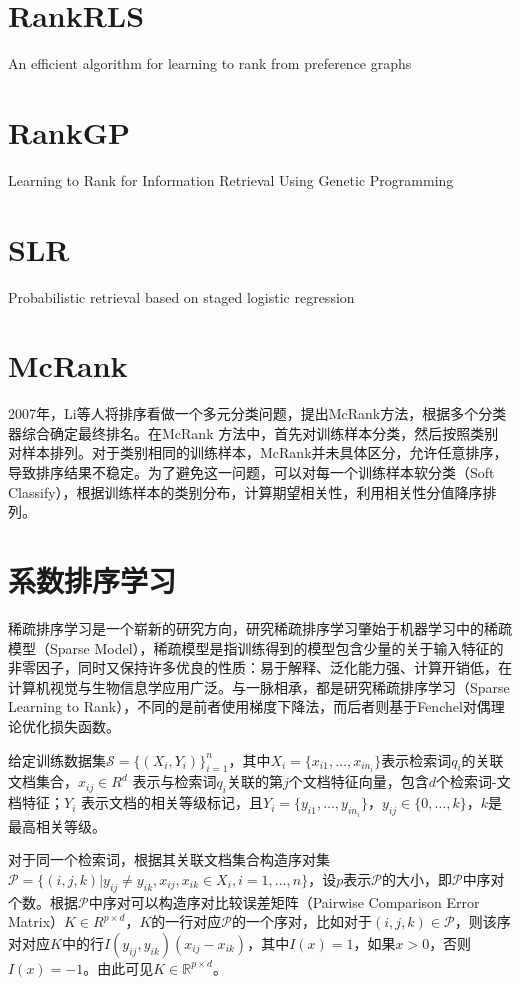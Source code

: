 \section{RankRLS}
An efficient algorithm for learning to rank from preference graphs\cite{pahikkala2009efficient}

\section{RankGP}
Learning to Rank for Information Retrieval Using Genetic Programming\cite{yeh2007learning}

\section{SLR}
Probabilistic retrieval based on staged logistic regression\cite{cooper1992probabilistic}

\section{McRank}
2007年，Li等人\cite{li2007mcrank}将排序看做一个多元分类问题，提出McRank方法，根据多个分类器综合确定最终排名。在McRank 方法中，首先对训练样本分类，然后按照类别对样本排列。对于类别相同的训练样本，McRank并未具体区分，允许任意排序，导致排序结果不稳定。为了避免这一问题，可以对每一个训练样本软分类（Soft Classify），根据训练样本的类别分布，计算期望相关性，利用相关性分值降序排列。

\section{系数排序学习}
稀疏排序学习是一个崭新的研究方向，研究稀疏排序学习肇始于机器学习中的稀疏模型（Sparse Model），稀疏模型是指训练得到的模型包含少量的关于输入特征的非零因子，同时又保持许多优良的性质：易于解释、泛化能力强、计算开销低，在计算机视觉与生物信息学应用广泛\cite{lai2012sparse}。\cite{lai2013efficient}与\cite{lai2012sparse}一脉相承，都是研究稀疏排序学习（Sparse Learning to Rank），不同的是前者使用梯度下降法，而后者则基于Fenchel对偶理论\cite{rifkin2007value}优化损失函数。

给定训练数据集$\mathcal{S} = \{(X_i,Y_i)\}_{i = 1}^n$，其中$X_i= \{x_{i1}, \ldots, x_{in_i}\}$表示检索词$q_i$的关联文档集合，$x_{ij}\in R^d$ 表示与检索词$q_i$关联的第$j$个文档特征向量，包含$d$个检索词-文档特征；$Y_i$ 表示文档的相关等级标记，且$Y_i = \{y_{i1},\ldots, y_{in_i}\}$，$y_{ij}\in \{0,\ldots, k\}$，$k$是最高相关等级。

对于同一个检索词，根据其关联文档集合构造序对集$\mathscr P = \{(i,j,k)| y_{ij}\ne y_{ik}, x_{ij}, x_{ik}\in X_i, i = 1,\ldots,n\}$，设$p$表示$\mathscr P$的大小，即$\mathscr P$中序对个数。根据$\mathscr P$中序对可以构造序对比较误差矩阵（Pairwise Comparison Error Matrix）$K \in R^{p\times d}$，$K$的一行对应$\mathscr P$的一个序对，比如对于$(i,j,k)\in \mathscr P$，则该序对对应$K$中的行$I(y_{ij},y_{ik})(x_{ij} - x_{ik})$，其中$I(x) = 1$，如果$x > 0$，否则$I(x) = -1$。由此可见$K\in \mathbb R^{p\times d}$。

